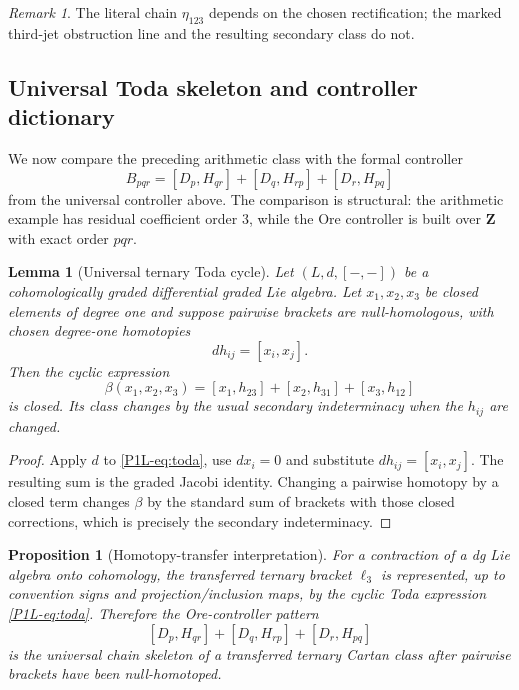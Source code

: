 \documentclass[11pt]{article}
\newtheorem{proposition}[theorem]{Proposition}
\newtheorem{lemma}[theorem]{Lemma}
\theoremstyle{remark}
\newtheorem{remark}[theorem]{Remark}
\newcommand{\Z}{\mathbf Z}
\begin{document}
\begin{remark}
The literal chain \(\eta_{123}\) depends on the chosen rectification; the marked third-jet obstruction line and the resulting secondary class do not.
\end{remark}


\subsection{Universal Toda skeleton and controller dictionary}

We now compare the preceding arithmetic class with the formal controller
\[
 B_{pqr}=[D_p,H_{qr}]+[D_q,H_{rp}]+[D_r,H_{pq}]
\]
from the universal controller above.  The comparison is structural: the arithmetic example has residual coefficient order \(3\), while the Ore controller is built over \(\Z\) with exact order \(pqr\).

\begin{lemma}[Universal ternary Toda cycle]\label{P1L-lem:toda-cycle}
Let \((L,d,[-,-])\) be a cohomologically graded differential graded Lie algebra.  Let \(x_1,x_2,x_3\) be closed elements of degree one and suppose pairwise brackets are null-homologous, with chosen degree-one homotopies
\[
 dh_{ij}=[x_i,x_j].
\]
Then the cyclic expression
\begin{equation}\label{P1L-eq:toda}
 \beta(x_1,x_2,x_3)
 =
 [x_1,h_{23}]+[x_2,h_{31}]+[x_3,h_{12}]
\end{equation}
is closed.  Its class changes by the usual secondary indeterminacy when the \(h_{ij}\) are changed.
\end{lemma}

\begin{proof}
Apply \(d\) to \eqref{P1L-eq:toda}, use \(dx_i=0\) and substitute \(dh_{ij}=[x_i,x_j]\).  The resulting sum is the graded Jacobi identity.  Changing a pairwise homotopy by a closed term changes \(\beta\) by the standard sum of brackets with those closed corrections, which is precisely the secondary indeterminacy.
\end{proof}

\begin{proposition}[Homotopy-transfer interpretation]\label{P1L-prop:hpt-controller}
For a contraction of a dg Lie algebra onto cohomology, the transferred ternary bracket \(\ell_3\) is represented, up to convention signs and projection/inclusion maps, by the cyclic Toda expression \eqref{P1L-eq:toda}.  Therefore the Ore-controller pattern
\[
 [D_p,H_{qr}]+[D_q,H_{rp}]+[D_r,H_{pq}]
\]
is the universal chain skeleton of a transferred ternary Cartan class after pairwise brackets have been null-homotoped.
\end{proposition}
\end{document}

